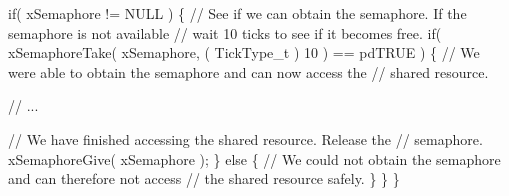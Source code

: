 \begin{DoxyPre}   if( xSemaphore != NULL )
   \{
       // See if we can obtain the semaphore.  If the semaphore is not available
       // wait 10 ticks to see if it becomes free.
       if( xSemaphoreTake( xSemaphore, ( TickType\_t ) 10 ) == pdTRUE )
       \{
           // We were able to obtain the semaphore and can now access the
           // shared resource.\end{DoxyPre}



\begin{DoxyPre}           // ...\end{DoxyPre}



\begin{DoxyPre}           // We have finished accessing the shared resource.  Release the
           // semaphore.
           xSemaphoreGive( xSemaphore );
       \}
       else
       \{
           // We could not obtain the semaphore and can therefore not access
           // the shared resource safely.
       \}
   \}
\}
\end{DoxyPre}
 
